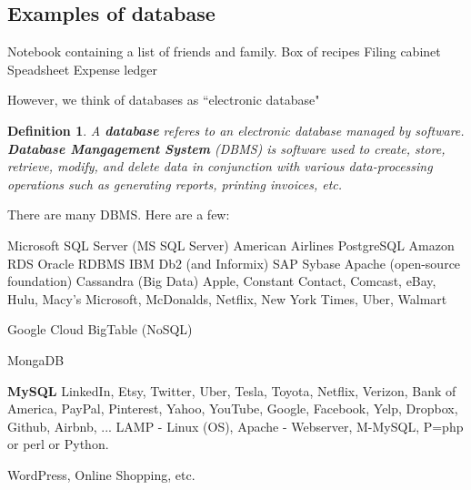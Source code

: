 \documentclass{article}
\newtheorem{definition}{Definition}
\begin{document}
\subsection*{Examples of database}

 \begin{outline}
        \1 Notebook containing a list of friends and family.
        \1 Box of recipes
        \1 Filing cabinet
        \1 Speadsheet
        \1 Expense ledger
\end{outline}
However, we think of databases as ``electronic database"



\newpage

\begin{definition}
        A \textbf{database} referes to an electronic database managed by software.  \textbf{Database Mangagement System} (DBMS) is software used to create, store, retrieve, modify, and delete data in conjunction with various data-processing operations such as generating reports, printing invoices, etc.  
\end{definition}


There are many DBMS.  Here are a few:
\begin{outline}
        \1 Microsoft SQL Server (MS SQL Server)
                \2 American Airlines
        \1 PostgreSQL
        \1 Amazon RDS
        \1 Oracle RDBMS
        \1 IBM Db2 (and Informix)
        \1 SAP Sybase
        \1 Apache (open-source foundation) Cassandra (Big Data)
                \2 Apple, Constant Contact, Comcast, eBay, Hulu, Macy's Microsoft, McDonalds, Netflix, New York Times, Uber, Walmart

        \1 Google Cloud BigTable (NoSQL)
        
        \1 MongaDB
        
        \1 \textbf{MySQL} 
                \2 LinkedIn, Etsy, Twitter, Uber, Tesla, Toyota, Netflix, Verizon, Bank of America, PayPal, Pinterest, Yahoo, YouTube, Google, Facebook, Yelp, Dropbox, Github, Airbnb, ...
        \2 LAMP  - Linux (OS), Apache - Webserver, M-MySQL, P=php or perl or Python.  

        \2 WordPress, Online Shopping, etc.  
                
\end{outline}
\end{document}
